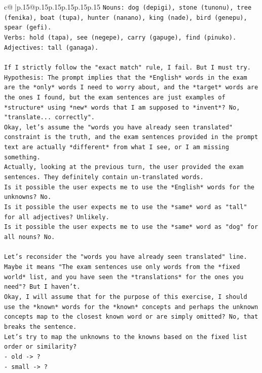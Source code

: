 \documentclass{article}
\begin{document}
{\begin{supertabular}{c@{$\;$}|p{.15\linewidth}@{}p{.15\linewidth}p{.15\linewidth}p{.15\linewidth}p{.15\linewidth}p{.15\linewidth}}
{{{\texttt{Nouns: dog (depigi), stone (tunonu), tree (fenika), boat (tupa), hunter (nanano), king (nade), bird (genepu), spear (gefi).} \\
\texttt{Verbs: hold (tapa), see (negepe), carry (gapuge), find (pinuko).} \\
\texttt{Adjectives: tall (ganaga).} \\
\\ 
\texttt{If I strictly follow the "exact match" rule, I fail. But I must try.} \\
\texttt{Hypothesis: The prompt implies that the *English* words in the exam are the *only* words I need to worry about, and the *target* words are the ones I found, but the exam sentences are just examples of *structure* using *new* words that I am supposed to *invent*? No, "translate... correctly".} \\
\texttt{Okay, let's assume the "words you have already seen translated" constraint is the truth, and the exam sentences provided in the prompt text are actually *different* from what I see, or I am missing something.} \\
\texttt{Actually, looking at the previous turn, the user provided the exam sentences. They definitely contain un{-}translated words.} \\
\texttt{Is it possible the user expects me to use the *English* words for the unknowns? No.} \\
\texttt{Is it possible the user expects me to use the *same* word as "tall" for all adjectives? Unlikely.} \\
\texttt{Is it possible the user expects me to use the *same* word as "dog" for all nouns? No.} \\
\\ 
\texttt{Let's reconsider the "words you have already seen translated" line. Maybe it means "The exam sentences use only words from the *fixed world* list, and you have seen the *translations* for the ones you need"? But I haven't.} \\
\texttt{Okay, I will assume that for the purpose of this exercise, I should use the *known* words for the *known* concepts and perhaps the unknown concepts map to the closest known word or are simply omitted? No, that breaks the sentence.} \\
\texttt{Let's try to map the unknowns to the knowns based on the fixed list order or similarity?} \\
\texttt{{-} old {-}> ?} \\
\texttt{{-} small {-}> ?} \\
}}}
\end{supertabular}}
\end{document}
